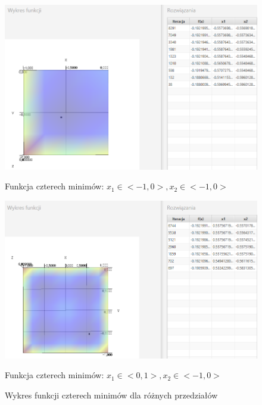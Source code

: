 \documentclass[10pt, a4paper]{article}
\begin{document}
\begin{figure}[htbp]
	\begin{minipage}[b]{1\textwidth}
		\centering
		\includegraphics[width=\linewidth]{images/14e.PNG}
		\caption{Funkcja czterech minimów: $x_{1}\in<-1,0>,  x_{2}\in<-1,0>$}
	\end{minipage}
	\begin{minipage}[b]{1\textwidth}
		\centering
		\includegraphics[width=\linewidth]{images/17e.PNG} 
		\caption{Funkcja czterech minimów: $x_{1}\in<0,1>,  x_{2}\in<-1,0>$}
	\end{minipage}
	\label{fig:12}
	\caption{Wykres funkcji czterech minimów dla różnych przedziałów}
\end{figure}

\pagebreak 
\end{document}
